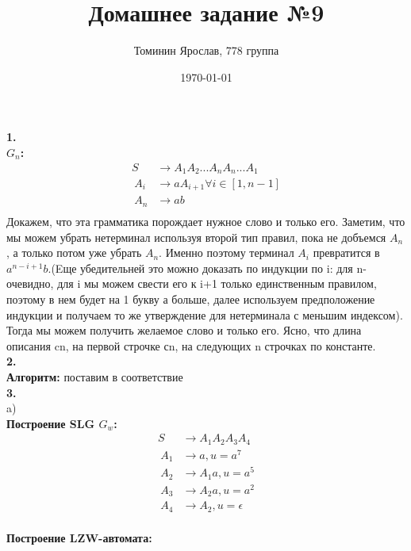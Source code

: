 \documentclass[a4paper,12pt]{article}
\author{Томинин Ярослав, 778 группа}
\title{Домашнее задание №9}
\date{\today}
\begin{document}
 

\maketitle
\newpage
\textbf{1.}\\
\textbf{$G_n$:}\\
\begin{align*}
	S&\to A_1A_2...A_nA_n...A_1\\\
	A_i&\to aA_{i+1} \forall i \in [1,n-1]\\\
	A_n&\to ab\\\
\end{align*}
Докажем, что эта грамматика порождает нужное слово и только его. Заметим, что мы можем убрать нетерминал используя второй тип правил, пока не добъемся $A_n$, а только потом уже убрать $A_n$. Именно поэтому терминал $A_i$ превратится в $a^{n-i+1}b$.(Eще убедительней это можно доказать по индукции по i: для n-очевидно, для i мы можем свести его к i+1 только единственным правилом, поэтому в нем будет на 1 букву а больше, далее используем предположение индукции и получаем то же утверждение для нетерминала с меньшим индексом). Тогда мы можем получить желаемое слово и только его. Ясно, что длина описания cn, на первой строчке сn, на следующих n строчках по константе.\\
\textbf{2.}\\
\textbf{Алгоритм:} поставим в соответствие \\
\textbf{3.}\\
a)\\
\textbf{Построение SLG $G_w$:}\\
\begin{align*}
	S&\to A_1A_2A_3A_4\\\
	A_1&\to a,u=a^7\\\ 
	A_2&\to A_1a,u=a^5\\\
	A_3&\to A_2a,u=a^2\\\
	A_4&\to A_2,u=\epsilon\\\
\end{align*}

\textbf{Построение LZW-автомата:}\\
\end{document}
